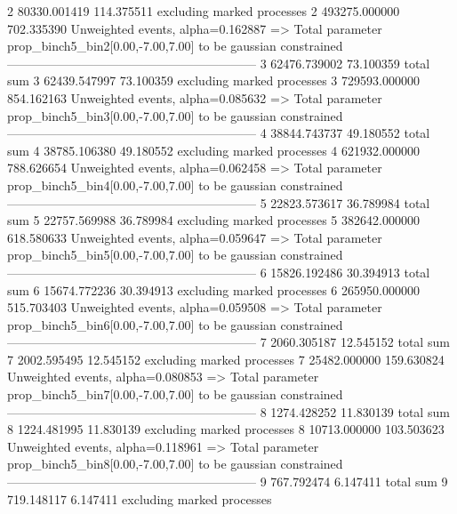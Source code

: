2          80330.001419    114.375511      excluding marked processes    
2          493275.000000   702.335390      Unweighted events, alpha=0.162887
  => Total parameter prop_binch5_bin2[0.00,-7.00,7.00] to be gaussian constrained
------------------------------------------------------------
3          62476.739002    73.100359       total sum                     
3          62439.547997    73.100359       excluding marked processes    
3          729593.000000   854.162163      Unweighted events, alpha=0.085632
  => Total parameter prop_binch5_bin3[0.00,-7.00,7.00] to be gaussian constrained
------------------------------------------------------------
4          38844.743737    49.180552       total sum                     
4          38785.106380    49.180552       excluding marked processes    
4          621932.000000   788.626654      Unweighted events, alpha=0.062458
  => Total parameter prop_binch5_bin4[0.00,-7.00,7.00] to be gaussian constrained
------------------------------------------------------------
5          22823.573617    36.789984       total sum                     
5          22757.569988    36.789984       excluding marked processes    
5          382642.000000   618.580633      Unweighted events, alpha=0.059647
  => Total parameter prop_binch5_bin5[0.00,-7.00,7.00] to be gaussian constrained
------------------------------------------------------------
6          15826.192486    30.394913       total sum                     
6          15674.772236    30.394913       excluding marked processes    
6          265950.000000   515.703403      Unweighted events, alpha=0.059508
  => Total parameter prop_binch5_bin6[0.00,-7.00,7.00] to be gaussian constrained
------------------------------------------------------------
7          2060.305187     12.545152       total sum                     
7          2002.595495     12.545152       excluding marked processes    
7          25482.000000    159.630824      Unweighted events, alpha=0.080853
  => Total parameter prop_binch5_bin7[0.00,-7.00,7.00] to be gaussian constrained
------------------------------------------------------------
8          1274.428252     11.830139       total sum                     
8          1224.481995     11.830139       excluding marked processes    
8          10713.000000    103.503623      Unweighted events, alpha=0.118961
  => Total parameter prop_binch5_bin8[0.00,-7.00,7.00] to be gaussian constrained
------------------------------------------------------------
9          767.792474      6.147411        total sum                     
9          719.148117      6.147411        excluding marked processes    
